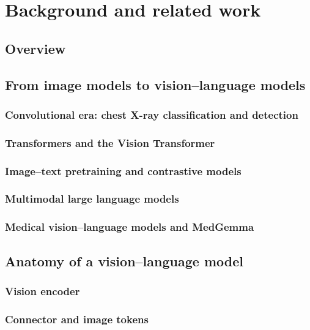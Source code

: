 \chapter{Background and related work}
\label{ch:background}


\section{Overview}

\section{From image models to vision--language models}
\subsection{Convolutional era: chest X-ray classification and detection}
\subsection{Transformers and the Vision Transformer}
\subsection{Image--text pretraining and contrastive models}
\subsection{Multimodal large language models}
\subsection{Medical vision--language models and MedGemma}

\section{Anatomy of a vision--language model}
\subsection{Vision encoder}
\subsection{Connector and image tokens}
